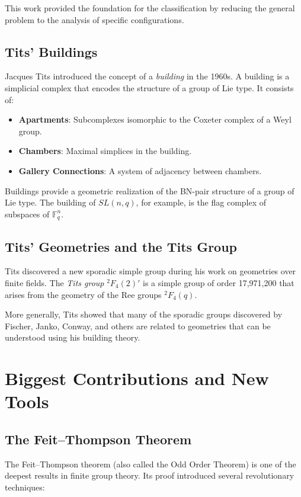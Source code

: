 This work provided the foundation for the classification by reducing the general problem to the analysis of specific configurations.

\subsection{Tits' Buildings}

Jacques Tits introduced the concept of a \emph{building} in the 1960s. A building is a simplicial complex that encodes the structure of a group of Lie type. It consists of:
\begin{itemize}
\item \textbf{Apartments}: Subcomplexes isomorphic to the Coxeter complex of a Weyl group.
\item \textbf{Chambers}: Maximal simplices in the building.
\item \textbf{Gallery Connections}: A system of adjacency between chambers.
\end{itemize}

Buildings provide a geometric realization of the BN-pair structure of a group of Lie type. The building of $SL(n, q)$, for example, is the flag complex of subspaces of $\mathbb{F}_q^n$.

\subsection{Tits' Geometries and the Tits Group}

Tits discovered a new sporadic simple group during his work on geometries over finite fields. The \emph{Tits group} $^2F_4(2)'$ is a simple group of order 17,971,200 that arises from the geometry of the Ree groups $^2F_4(q)$.

More generally, Tits showed that many of the sporadic groups discovered by Fischer, Janko, Conway, and others are related to geometries that can be understood using his building theory.

\section{Biggest Contributions and New Tools}

\subsection{The Feit--Thompson Theorem}

The Feit--Thompson theorem (also called the Odd Order Theorem) is one of the deepest results in finite group theory. Its proof introduced several revolutionary techniques:


